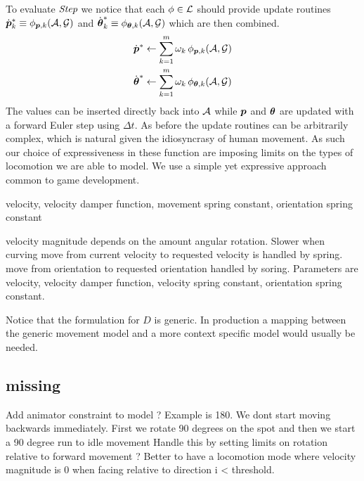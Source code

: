 To evaluate $\textit{Step}$ we notice that each $\phi\in\mathcal{L}$ should provide update routines $\dot{\boldsymbol{p }}_k^* \equiv \phi_{\boldsymbol{p },k}(\mathcal{A},\mathcal{G})$ and $\dot{\boldsymbol{\theta }}_k^* \equiv \phi_{\boldsymbol{\theta }, k}(\mathcal{A},\mathcal{G})$ which are then combined.
\begin{subequations}
\begin{align}
\dot{\boldsymbol{p }}^*&\leftarrow \sum_{k=1}^{m}\omega_k \,\phi_{\boldsymbol{p },k}(\mathcal{A},\mathcal{G})\\
\dot{\boldsymbol{\theta }}^*&\leftarrow \sum_{k=1}^{m}\omega_k \,\phi_{\boldsymbol{\theta },k}(\mathcal{A},\mathcal{G})
\end{align}
\end{subequations}
The values can be inserted directly back into $\mathcal{A}$ while $\boldsymbol{p }$ and $\boldsymbol{\theta }$ are updated with a forward Euler step  using $\Delta{t}$. As before the update routines can be arbitrarily complex, which is natural given the idiosyncrasy of human movement. As such our choice of expressiveness in these function are imposing limits on the types of locomotion we are able to model. We use a simple yet expressive approach common to game development.   

velocity, velocity damper function, movement spring constant, orientation spring constant

velocity magnitude depends on the amount angular rotation. Slower when curving
move from current velocity to requested velocity is handled by spring.
move from orientation to requested orientation handled by soring.
Parameters are velocity, velocity damper function, velocity spring constant, orientation spring constant.


Notice that the formulation for $D$ is generic. In production a mapping between the generic movement model and a more context specific model would usually be needed. 

\subsection{missing}
Add animator constraint to model ? Example is 180. We dont start moving backwards immediately. First we rotate 90 degrees on the spot and then we start a 90 degree run to idle movement
Handle this by setting limits on rotation relative to forward movement ? Better to have a locomotion mode where velocity magnitude is 0 when facing relative to direction i < threshold.

